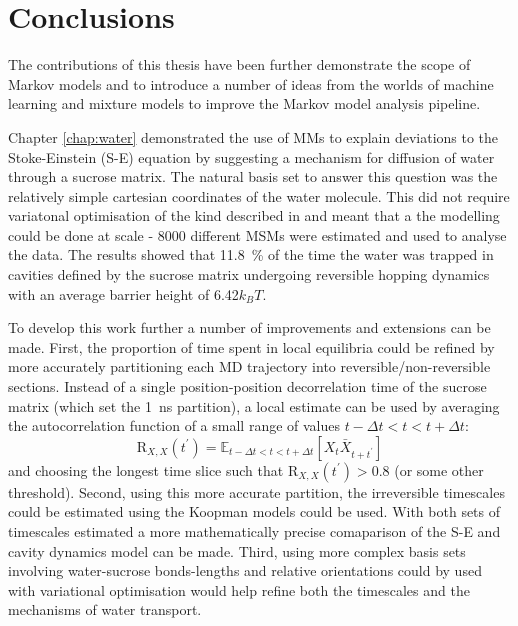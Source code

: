 \let\textcircled=\pgftextcircled
\chapter{Conclusions}
\label{chap:conclusions}


The contributions of this thesis have been further demonstrate the scope of Markov models and to introduce a number of ideas from the worlds of machine learning and mixture models to improve the Markov model analysis pipeline. 

Chapter \ref{chap:water} demonstrated the use of MMs to explain deviations to the Stoke-Einstein (S-E) equation by suggesting a mechanism for diffusion of water through a sucrose matrix. The natural basis set to answer this question was the relatively simple cartesian coordinates of the water molecule. This did not require variatonal optimisation of the kind described in \cite{schererVariationalSelectionFeatures2019} and meant that a the modelling could be done at scale - 8000 different MSMs were estimated and used to analyse the data. The results showed that \SI{11.8}{\percent} of the time the water was trapped in cavities defined by the sucrose matrix undergoing reversible hopping dynamics with an average barrier height of \num{6.42}$k_{B}T$. 

To develop this work further a number of improvements and extensions can be made. First, the proportion of time spent in local equilibria could be refined by more accurately partitioning each MD trajectory into reversible/non-reversible sections. Instead of a single position-position decorrelation time of the sucrose matrix (which set the \SI{1}{\nano\second} partition), a local estimate can be used by averaging the autocorrelation function of a small range of values $t-\Delta t < t < t+\Delta t$:
\begin{equation}
\mathrm{R}_{X,  X}(t^{\prime})=\mathbb{E}_{t-\Delta t < t < t+\Delta t}\left[X_{t} \bar{X}_{t+t^{\prime}}\right]
\end{equation}
and choosing the longest time slice such that $\mathrm{R}_{X,  X}(t^{\prime}) > 0.8$ (or some other threshold). Second, using this more accurate partition, the irreversible timescales could be estimated using the Koopman models \cite{wuVariationalApproachLearning2019} could be used. With both sets of timescales estimated a more mathematically precise comaparison of the S-E and cavity dynamics model can be made. Third, using more complex basis sets involving water-sucrose bonds-lengths and relative orientations could by used with variational optimisation would help refine both the timescales and the mechanisms of water transport. 

